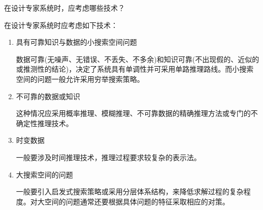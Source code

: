 \begin{question}
在设计专家系统时，应考虑哪些技术？
\end{question}
\begin{solution}
在设计专家系统时应考虑如下技术：
	\begin{enumerate}
		\item 具有可靠知识与数据的小搜索空间问题 \par
		数据可靠(无噪声、无错误、不丢失、不多余)和知识可靠(不出现假的、近似的或推测性的结论)，决定了系统具有单调性并可采用单路推理路线。而小搜索空间的问题一般允许采用穷举搜索策略。 
		\item 不可靠的数据或知识 \par
		这种情况应采用概率推理、模糊推理、不可靠数据的精确推理方法或专门的不确定性推理技术。
		\item 时变数据 \par
		一般要涉及时间推理技术，推理过程要求较复杂的表示法。
		\item 大搜索空间的问题 \par
		一般要引入启发式搜索策略或采用分层体系结构，来降低求解过程的复杂程度。对大空间的问题通常还要根据具体问题的特征采取相应的对策。
	\end{enumerate}
\end{solution}

